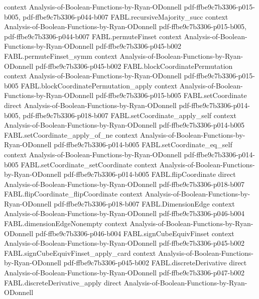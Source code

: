 \begin{theorem}
  {context}
  {Analysis-of-Boolean-Functions-by-Ryan-ODonnell}
  {pdf-ffbe9c7b3306-p015-b005,
    pdf-ffbe9c7b3306-p044-b007}
\proofstep
  {FABL.recursiveMajority_succ}
  {context}
  {Analysis-of-Boolean-Functions-by-Ryan-ODonnell}
  {pdf-ffbe9c7b3306-p015-b005,
    pdf-ffbe9c7b3306-p044-b007}
\proofstep
  {FABL.permuteFinset}
  {context}
  {Analysis-of-Boolean-Functions-by-Ryan-ODonnell}
  {pdf-ffbe9c7b3306-p045-b002}
\proofstep
  {FABL.permuteFinset_symm}
  {context}
  {Analysis-of-Boolean-Functions-by-Ryan-ODonnell}
  {pdf-ffbe9c7b3306-p045-b002}
\proofstep
  {FABL.blockCoordinatePermutation}
  {context}
  {Analysis-of-Boolean-Functions-by-Ryan-ODonnell}
  {pdf-ffbe9c7b3306-p015-b005}
\proofstep
  {FABL.blockCoordinatePermutation_apply}
  {context}
  {Analysis-of-Boolean-Functions-by-Ryan-ODonnell}
  {pdf-ffbe9c7b3306-p015-b005}
\proofstep
  {FABL.setCoordinate}
  {direct}
  {Analysis-of-Boolean-Functions-by-Ryan-ODonnell}
  {pdf-ffbe9c7b3306-p014-b005,
    pdf-ffbe9c7b3306-p018-b007}
\proofstep
  {FABL.setCoordinate_apply_self}
  {context}
  {Analysis-of-Boolean-Functions-by-Ryan-ODonnell}
  {pdf-ffbe9c7b3306-p014-b005}
\proofstep
  {FABL.setCoordinate_apply_of_ne}
  {context}
  {Analysis-of-Boolean-Functions-by-Ryan-ODonnell}
  {pdf-ffbe9c7b3306-p014-b005}
\proofstep
  {FABL.setCoordinate_eq_self}
  {context}
  {Analysis-of-Boolean-Functions-by-Ryan-ODonnell}
  {pdf-ffbe9c7b3306-p014-b005}
\proofstep
  {FABL.setCoordinate_setCoordinate}
  {context}
  {Analysis-of-Boolean-Functions-by-Ryan-ODonnell}
  {pdf-ffbe9c7b3306-p014-b005}
\proofstep
  {FABL.flipCoordinate}
  {direct}
  {Analysis-of-Boolean-Functions-by-Ryan-ODonnell}
  {pdf-ffbe9c7b3306-p018-b007}
\proofstep
  {FABL.flipCoordinate_flipCoordinate}
  {context}
  {Analysis-of-Boolean-Functions-by-Ryan-ODonnell}
  {pdf-ffbe9c7b3306-p018-b007}
\proofstep
  {FABL.DimensionEdge}
  {context}
  {Analysis-of-Boolean-Functions-by-Ryan-ODonnell}
  {pdf-ffbe9c7b3306-p046-b004}
\proofstep
  {FABL.dimensionEdgeNonempty}
  {context}
  {Analysis-of-Boolean-Functions-by-Ryan-ODonnell}
  {pdf-ffbe9c7b3306-p046-b004}
\proofstep
  {FABL.signCubeEquivFinset}
  {context}
  {Analysis-of-Boolean-Functions-by-Ryan-ODonnell}
  {pdf-ffbe9c7b3306-p045-b002}
\proofstep
  {FABL.signCubeEquivFinset_apply_card}
  {context}
  {Analysis-of-Boolean-Functions-by-Ryan-ODonnell}
  {pdf-ffbe9c7b3306-p045-b002}
\proofstep
  {FABL.discreteDerivative}
  {direct}
  {Analysis-of-Boolean-Functions-by-Ryan-ODonnell}
  {pdf-ffbe9c7b3306-p047-b002}
\proofstep
  {FABL.discreteDerivative_apply}
  {direct}
  {Analysis-of-Boolean-Functions-by-Ryan-ODonnell}

\end{theorem}
